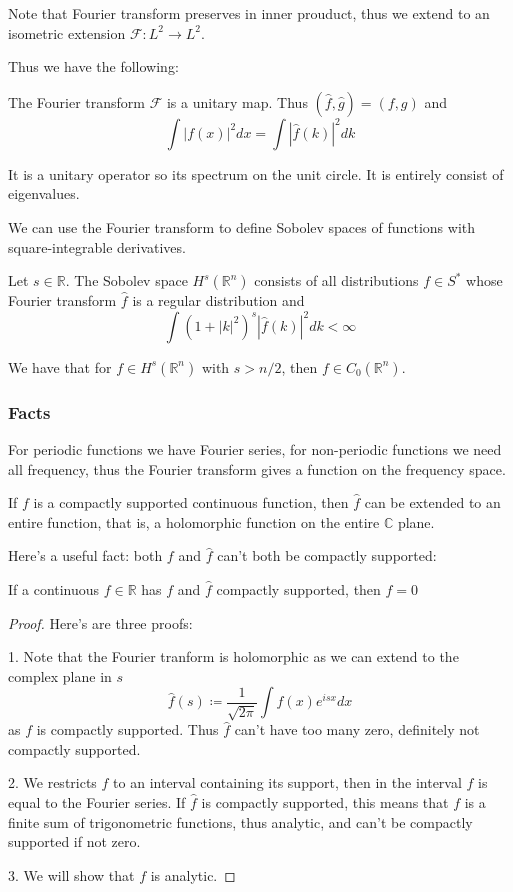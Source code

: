 \documentclass[main.tex]{subfiles}
\begin{document}
Note that Fourier transform preserves in inner prouduct, thus we extend to an isometric extension $\mathcal{F}: L^2 \rightarrow L^2$.

Thus we have the following:

\begin{theorem}
The Fourier transform $\mathcal{F}$ is a unitary map. 
Thus $(\hat{f}, \hat{g}) = (f, g)$ and 
$$
\int |f(x)|^2 dx = \int |\hat{f}(k)|^2 dk
$$
\end{theorem}

It is a unitary operator so its spectrum on the unit circle. It is entirely consist of eigenvalues.

We can use the Fourier transform to define Sobolev spaces of functions with square-integrable derivatives. 

\begin{definition}
Let $s \in \mathbb{R}$. The Sobolev space $H^s(\mathbb{R}^n)$ consists of all distributions $f \in S^*$ whose Fourier transform $\hat{f}$ is a regular distribution and 
$$
\int (1 + |k|^2)^s |\hat{f}(k)|^2 dk < \infty
$$
\end{definition}

We have that for $f \in H^s(\mathbb{R}^n)$ with $s > n/2$, then $f \in C_0(\mathbb{R}^n)$.
\subsubsection{Facts}
For periodic functions we have Fourier series, for non-periodic functions we need all frequency, thus the Fourier transform gives a function on the frequency space.

If $f$ is a compactly supported continuous function, then $\hat{f}$ can be extended to an entire function, that is, a holomorphic function on the entire $\mathbb{C}$ plane.

Here's a useful fact: both $f$ and $\hat{f}$ can't both be compactly supported:

\begin{theorem}
If a continuous $f \in \mathbb{R}$ has $f$ and $\hat{f}$ compactly supported, then $f = 0$
\end{theorem}

\begin{proof}
Here's are three proofs:

1. Note that the Fourier tranform is holomorphic as we can extend to the complex plane in $s$
$$
\hat{f}(s) \coloneqq \frac{1}{\sqrt{2\pi}} \int f(x) e^{isx} dx
$$
as $f$ is compactly supported. Thus $\hat{f}$ can't have too many zero, definitely not compactly supported.

2. We restricts $f$ to an interval containing its support, then in the interval $f$ is equal to the Fourier series. If $\hat{f}$ is compactly supported, this means that $f$ is a finite sum of trigonometric functions, thus analytic, and can't be compactly supported if not zero.

3. We will show that $f$ is analytic. 
\end{proof}
\end{document}

